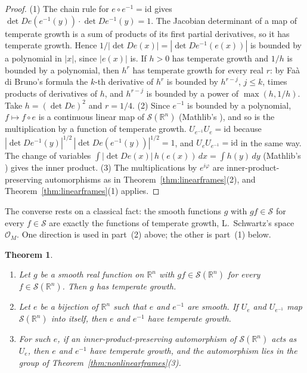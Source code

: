 \documentclass[11pt]{article}
\newtheorem{theorem}{Theorem}[section]
\theoremstyle{definition}
\begin{document}
\begin{proof}
  (1) The chain rule for $e \circ e^{-1} = \mathrm{id}$ gives
  $\det De(e^{-1}(y)) \cdot \det De^{-1}(y) = 1$. The Jacobian determinant of a map of temperate
  growth is a sum of products of its first partial derivatives, so it has temperate growth. Hence
  $1/|\det De(x)| = |\det De^{-1}(e(x))|$ is bounded by a polynomial in $|x|$, since $|e(x)|$ is.
  If $h > 0$ has temperate growth and $1/h$ is bounded by a polynomial, then $h^r$ has temperate
  growth for every real $r$: by Faà di Bruno's formula the $k$-th derivative of $h^r$ is bounded
  by $h^{r-j}$, $j \le k$, times products of derivatives of $h$, and $h^{r-j}$ is bounded by a
  power of $\max(h, 1/h)$. Take $h = (\det De)^2$ and $r = 1/4$.
  (2) Since $e^{-1}$ is bounded by a polynomial, $f \mapsto f \circ e$ is a continuous linear map
  of $\mathcal S(\mathbb R^n)$ (Mathlib's ), and so is the
  multiplication by a function of temperate growth. $U_{e^{-1}}U_e = \mathrm{id}$ because
  $|\det De^{-1}(y)|^{1/2}\,|\det De(e^{-1}(y))|^{1/2} = 1$, and $U_e U_{e^{-1}} = \mathrm{id}$ in
  the same way. The change of variables $\int |\det De(x)|\, h(e(x))\,dx = \int h(y)\,dy$ (Mathlib's
  ) gives the inner product.
  (3) The multiplications by $e^{i\varphi}$ are inner-product-preserving automorphisms as in
  Theorem~\ref{thm:linearframes}(2), and Theorem~\ref{thm:linearframes}(1) applies.
\end{proof}

The converse rests on a classical fact: the smooth functions $g$ with $g f \in \mathcal S$ for
every $f \in \mathcal S$ are exactly the functions of temperate growth, L.~Schwartz's space
$\mathcal O_M$. One direction is used in part~(2) above; the other is part~(1) below.

\begin{theorem}\label{thm:nonlinearconverse}
  \begin{enumerate}
    \item Let $g$ be a smooth real function on $\mathbb R^n$ with $g f \in \mathcal S(\mathbb R^n)$
      for every $f \in \mathcal S(\mathbb R^n)$. Then $g$ has temperate growth.
    \item Let $e$ be a bijection of $\mathbb R^n$ such that $e$ and $e^{-1}$ are smooth. If $U_e$
      and $U_{e^{-1}}$ map $\mathcal S(\mathbb R^n)$ into itself, then $e$ and $e^{-1}$ have
      temperate growth.
    \item For such $e$, if an inner-product-preserving automorphism of $\mathcal S(\mathbb R^n)$
      acts as $U_e$, then $e$ and $e^{-1}$ have temperate growth, and the automorphism lies in the
      group of Theorem~\ref{thm:nonlinearframes}(3).
  \end{enumerate}
\end{theorem}
\end{document}
